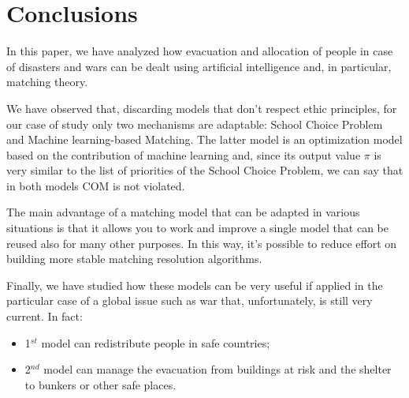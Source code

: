 \section{Conclusions}
In this paper, we have analyzed how evacuation and allocation of people in case of disasters and wars can be dealt using artificial intelligence and, in particular, matching theory.

We have observed that, discarding models that don’t respect ethic principles, for our case of study only two mechanisms are adaptable: School Choice Problem and Machine learning-based Matching. The latter model is an optimization model based on the contribution of machine learning and, since its output value \(\pi\) is very similar to the list of priorities of the School Choice Problem, we can say that in both models COM is not violated.

The main advantage of a matching model that can be adapted in various situations is that it allows you to work and improve a single model that can be reused also for many other purposes. In this way, it’s possible to reduce effort on building more stable matching resolution algorithms.

Finally, we have studied how these models can be very useful if applied in the particular case of a global issue such as war that, unfortunately, is still very current. In fact:
\begin{itemize}
    \item 1\(^{st}\) model can redistribute people in safe countries;
    \item 2\(^{nd}\) model can manage the evacuation from buildings at risk and the shelter to bunkers or other safe places.
\end{itemize}

